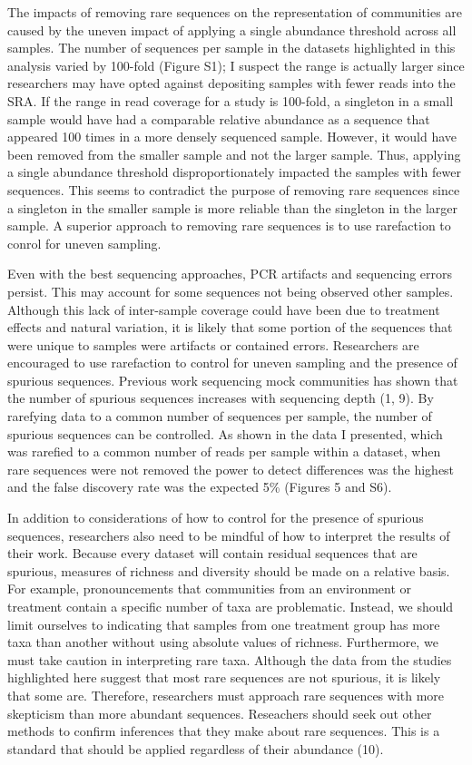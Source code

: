 \documentclass[]{article}
\begin{document}
The impacts of removing rare sequences on the representation of
communities are caused by the uneven impact of applying a single
abundance threshold across all samples. The number of sequences per
sample in the datasets highlighted in this analysis varied by 100-fold
(Figure S1); I suspect the range is actually larger since researchers
may have opted against depositing samples with fewer reads into the SRA.
If the range in read coverage for a study is 100-fold, a singleton in a
small sample would have had a comparable relative abundance as a
sequence that appeared 100 times in a more densely sequenced sample.
However, it would have been removed from the smaller sample and not the
larger sample. Thus, applying a single abundance threshold
disproportionately impacted the samples with fewer sequences. This seems
to contradict the purpose of removing rare sequences since a singleton
in the smaller sample is more reliable than the singleton in the larger
sample. A superior approach to removing rare sequences is to use
rarefaction to conrol for uneven sampling.

Even with the best sequencing approaches, PCR artifacts and sequencing
errors persist. This may account for some sequences not being observed
other samples. Although this lack of inter-sample coverage could have
been due to treatment effects and natural variation, it is likely that
some portion of the sequences that were unique to samples were artifacts
or contained errors. Researchers are encouraged to use rarefaction to
control for uneven sampling and the presence of spurious sequences.
Previous work sequencing mock communities has shown that the number of
spurious sequences increases with sequencing depth (1, 9). By rarefying
data to a common number of sequences per sample, the number of spurious
sequences can be controlled. As shown in the data I presented, which was
rarefied to a common number of reads per sample within a dataset, when
rare sequences were not removed the power to detect differences was the
highest and the false discovery rate was the expected 5\% (Figures 5 and
S6).

In addition to considerations of how to control for the presence of
spurious sequences, researchers also need to be mindful of how to
interpret the results of their work. Because every dataset will contain
residual sequences that are spurious, measures of richness and diversity
should be made on a relative basis. For example, pronouncements that
communities from an environment or treatment contain a specific number
of taxa are problematic. Instead, we should limit ourselves to
indicating that samples from one treatment group has more taxa than
another without using absolute values of richness. Furthermore, we must
take caution in interpreting rare taxa. Although the data from the
studies highlighted here suggest that most rare sequences are not
spurious, it is likely that some are. Therefore, researchers must
approach rare sequences with more skepticism than more abundant
sequences. Reseachers should seek out other methods to confirm
inferences that they make about rare sequences. This is a standard that
should be applied regardless of their abundance (10).
\end{document}
